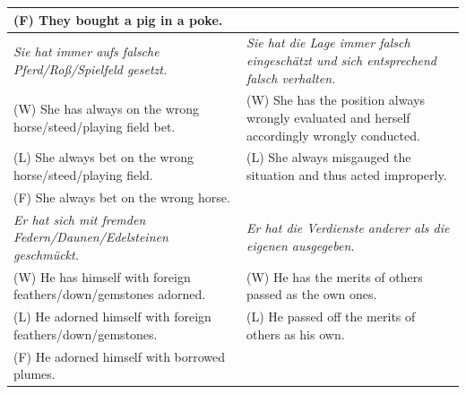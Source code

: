 \begin{table}[]
{\begin{tabular}{|p{4in}|p{4in}|}
\hspace{3mm}(F) They bought a pig in a poke.                                       &                                                                                              \\ \hline
\textit{Sie hat immer aufs falsche Pferd/Roß/Spielfeld gesetzt.}       & \textit{Sie hat die Lage immer falsch eingeschätzt und sich entsprechend falsch verhalten.}  \\
\hspace{3mm}(W) She has always on the wrong horse/steed/playing field bet.         & \hspace{3mm}(W) She has the position always wrongly evaluated and herself accordingly wrongly conducted. \\
\hspace{3mm}(L) She always bet on the wrong horse/steed/playing field.             & \hspace{3mm}(L) She always misgauged the situation and thus acted improperly.                            \\
\hspace{3mm}(F) She always bet on the wrong horse.                                 &                                                                                              \\ \hline
\textit{Er hat sich mit fremden Federn/Daunen/Edelsteinen geschmückt.} & \textit{Er hat die Verdienste anderer als die eigenen ausgegeben.}                           \\
\hspace{3mm}(W) He has himself with foreign feathers/down/gemstones adorned.       & \hspace{3mm}(W) He has the merits of others passed as the own ones.                                      \\
\hspace{3mm}(L) He adorned himself with foreign feathers/down/gemstones.           & \hspace{3mm}(L) He passed off the merits of others as his own.                                           \\
\hspace{3mm}(F) He adorned himself with borrowed plumes.                           &                                                                                              \\ \hline
\end{tabular}}
\end{table}

